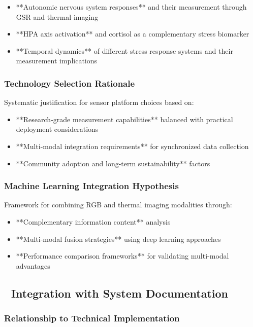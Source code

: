 \documentclass[11pt,a4paper]{article}
\begin{document}
\begin{itemize}
\item **Autonomic nervous system responses** and their measurement through GSR and thermal imaging
\item **HPA axis activation** and cortisol as a complementary stress biomarker
\item **Temporal dynamics** of different stress response systems and their measurement implications

\end{itemize}
\subsubsection{Technology Selection Rationale}

Systematic justification for sensor platform choices based on:

\begin{itemize}
\item **Research-grade measurement capabilities** balanced with practical deployment considerations
\item **Multi-modal integration requirements** for synchronized data collection
\item **Community adoption and long-term sustainability** factors

\end{itemize}
\subsubsection{Machine Learning Integration Hypothesis}

Framework for combining RGB and thermal imaging modalities through:

\begin{itemize}
\item **Complementary information content** analysis
\item **Multi-modal fusion strategies** using deep learning approaches
\item **Performance comparison frameworks** for validating multi-modal advantages

\end{itemize}
\subsection{🔗 Integration with System Documentation}

\subsubsection{Relationship to Technical Implementation}
\end{document}
